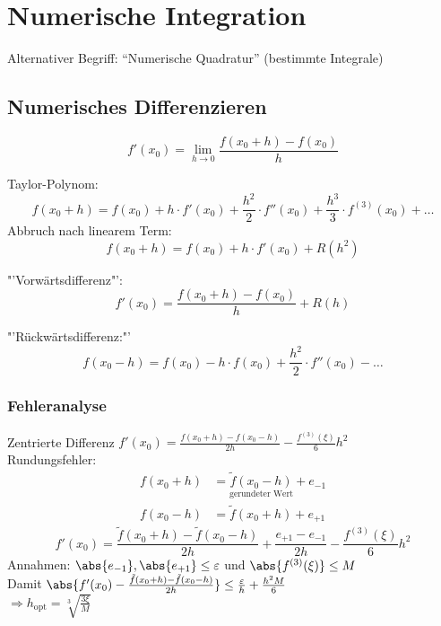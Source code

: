 \chapter{Numerische Integration}
Alternativer Begriff: "`Numerische Quadratur"' (bestimmte Integrale)

\section{Numerisches Differenzieren}

\begin{equation}
	f'(x_0) = \lim\limits_{h\rightarrow 0} \frac{f(x_0 + h) - f(x_0)}{h}
\end{equation}

Taylor-Polynom: \[ f(x_0 + h) = f(x_0) + h\cdot f'(x_0) + \frac{h^2}{2} \cdot f''(x_0) + \frac{h^3}{3}\cdot f^{(3)}(x_0) + \ldots\]
Abbruch nach linearem Term: \[f(x_0+h) = f(x_0) + h\cdot f'(x_0) + R(h^2)\]

"'Vorwärtsdifferenz"':
\begin{equation}
	f'(x_0) = \frac{f(x_0 + h) - f(x_0)}{h} + R(h)
\end{equation}

"'Rückwärtsdifferenz:"'
\begin{equation}
	f(x_0 - h) = f(x_0) - h \cdot f(x_0) + \frac{h^2}{2} \cdot f''(x_0) - \ldots
\end{equation}

\subsection{Fehleranalyse}
Zentrierte Differenz $f'(x_0) = \frac{f(x_0+h) - f(x_0-h)}{2h} - \frac{f^{(3)}(\xi)}{6}h^2$\\
Rundungsfehler:
\begin{equation}
\begin{split}
f(x_0+h) &= \underset{\text{gerundeter Wert}}{\tilde{f}(x_0-h)} + e_{-1}\\
f(x_0-h) &= \tilde{f}(x_0+h) + e_{+1}
\end{split}
\end{equation}
\begin{equation}
f'(x_0) = \frac{\tilde{f}(x_0+h) - \tilde{f}(x_0-h)}{2h} + \frac{e_{+1} - e_{-1}}{2h} - \frac{f^{(3)}(\xi)}{6}h^2
\end{equation}
Annahmen: $\abs{e_{-1}},\abs{e_{+1}} \leq\varepsilon$ und $\abs{f^{(3)}(\xi)} \leq M$\\
Damit $\abs{f'(x_0) - \frac{\tilde{f}(x_0+h) - \tilde{f}(x_0-h)}{2h}} \leq\frac{\varepsilon}{h} + \frac{h^2M}{6}$\\
$\Rightarrow h_{\text{opt}} = \sqrt[3]{\frac{3\xi}{M}}$

